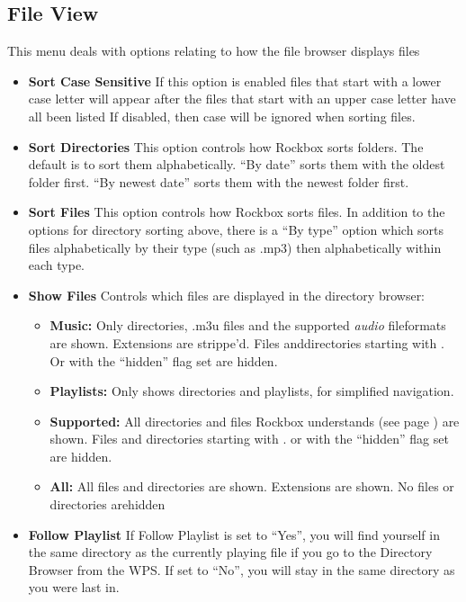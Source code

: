 \begin{itemize}
\subsection{File View}
This menu deals with options relating to how the file browser displays files

\begin{itemize}
\item \textbf{Sort Case Sensitive}
  If this option is enabled files that start with a lower case letter will appear after the files that start with an upper case letter have all been listed  If disabled, then case will be ignored when sorting files.
\item \textbf{Sort Directories}
  This option controls how Rockbox sorts folders.  The default is to sort them alphabetically.  ``By date'' sorts them with the oldest folder first.  ``By newest date'' sorts them with the newest folder first.
  
\item \textbf{Sort Files}
  This option controls how Rockbox sorts files.  In addition to the options for directory sorting above, there is a ``By type'' option which sorts files alphabetically by their type (such as .mp3) then alphabetically within each type.

\item \textbf{\label{ref:ShowFiles}Show Files}
  Controls which files are displayed in the directory browser:

  \begin{itemize}
  \item \textbf{Music: }
    Only directories, .m3u files and the supported \emph{audio} fileformats are shown. Extensions are strippe'd. Files anddirectories starting with . Or with the ``hidden'' flag set are hidden.
  \item \textbf{Playlists:} 
    Only shows directories and playlists, for simplified navigation.
  \item \textbf{Supported:} 
    All directories and files Rockbox understands (see page \pageref{ref:Supportedfileformats}) are shown. Files and directories starting with . or with the ``hidden'' flag set are hidden.
  \item \textbf{All:}
    All files and directories are shown. Extensions are shown. No files or directories arehidden
  \end{itemize}
  
\item \textbf{Follow Playlist}
  If Follow Playlist is set to ``Yes'', you will find yourself in the same directory as the currently playing file if you go to the Directory Browser from the WPS. If set to ``No'', you will stay in the same directory as you were last in.


\end{itemize}
\end{itemize}
